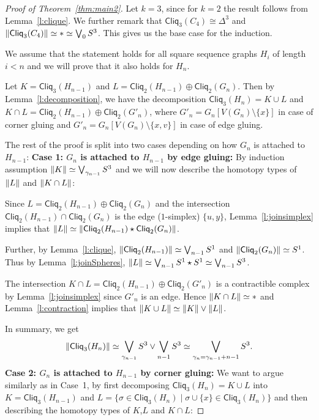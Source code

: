 \documentclass[a4paper, v2021]{lipics-v2021}
\theoremstyle{plain}
\theoremstyle{definition}
\newcommand{\Cliq}[2]{\mathsf{Cliq}_{#1}(#2)}
\DeclarePairedDelimiter{\gr}{\lVert}{\rVert}
\begin{document}
\begin{proof}[Proof of Theorem~\ref{thm:main2}]
Let $k=3$, since for $k = 2$ the result follows from Lemma~\ref{l:clique}. We further remark that $\Cliq{3}{C_4} \cong \Delta^3$ and $\gr{\Cliq{3}{C_4}} \simeq * \simeq \bigvee_0 S^3$. This gives us the base case for the induction.

We assume that the statement holds for all square sequence graphs $H_i$ of length $i<n$ and we will prove that it also holds for $H_{n}$.

Let $K = \Cliq{3}{H_{n-1}}$ and $L = \Cliq{2}{H_{n-1}} \oplus \Cliq{2}{G_{n}}$. Then by Lemma~\ref{l:decomposition}, we have the decomposition $\Cliq{3}{H_{n}} = K \cup L$ and $
K \cap L = \Cliq{2}{H_{n-1}} \oplus \Cliq{2}{G'_{n}}$, 
where $G'_{n} = G_{n}[V(G_{n}) \setminus \{x\}]$ in case of corner gluing and $G'_{n} = G_{n}[ V(G_{n}) \setminus \{x,v\}]$ in case of edge gluing. 

The rest of the proof is split into two cases depending on how $G_{n}$ is attached to $H_{n-1}$:
\vspace{1ex}
\newline
\textbf{Case 1: $G_{n}$ is attached to $H_{n-1}$ by edge gluing:}
By induction assumption $\gr{K} \simeq \bigvee_{\gamma_{n-1}} S^3$ and we will now describe the homotopy types of $\gr{L}$ and $\gr{K \cap L}$:


Since $L = \Cliq{2}{H_{n-1}} \oplus \Cliq{2}{G_{n}}$ and the intersection $\Cliq{2}{H_{n-1}} \cap \Cliq{2}{G_{n}}$ is the edge ($1$-simplex) $\{u,y\}$, Lemma~\ref{l:joinsimplex} implies that $\gr{L} \simeq \gr{\Cliq{2}{H_{n-1}} \star \Cliq{2}{G_{n}}}$. 

Further, by Lemma~\ref{l:clique}, $\gr{\Cliq{2}{H_{n-1}}} \simeq \bigvee_{n-1} S^1$ and $\gr{\Cliq{2}{G_{n}}} \simeq S^1$. 
Thus by Lemma~\ref{l:joinSpheres}, $\gr{L} \simeq \bigvee_{{n-1}} S^{1} \star S^1 \simeq \bigvee_{{n-1}} S^{3}$.

The intersection $K \cap L = \Cliq{2}{H_{n-1}} \oplus \Cliq{2}{G'_{n}}$ is a contractible complex by Lemma~\ref{l:joinsimplex} since $G'_{n}$ is an edge. Hence $\gr{K \cap L} \simeq *$ and Lemma~\ref{l:contraction} implies that $\gr{K \cup L} \simeq \gr{K} \vee \gr{L}$.

In summary, we get
\[\gr{\Cliq{3}{H_n}} \simeq \bigvee_{\gamma_{n-1}} S^3 \vee \bigvee_{n-1} S^3 \simeq \bigvee_{\gamma_n = {\gamma_{n-1} + {n-1}}} S^3.\]
\newline
\vspace{1ex}
\textbf{Case 2: $G_{n}$ is attached to $H_{n-1}$ by corner gluing:}
We want to argue similarly as in Case~1, by first decomposing $\Cliq{3}{H_n} = K \cup L$ into $K = \Cliq{3}{H_{n-1}}$ and $L = \{\sigma \in \Cliq{3}{H_n} \mid \sigma \cup \{x\} \in \Cliq{3}{H_n}\}$ and then describing the homotopy types of $K$,$L$ and $K \cap L$:


\end{proof}
\end{document}
